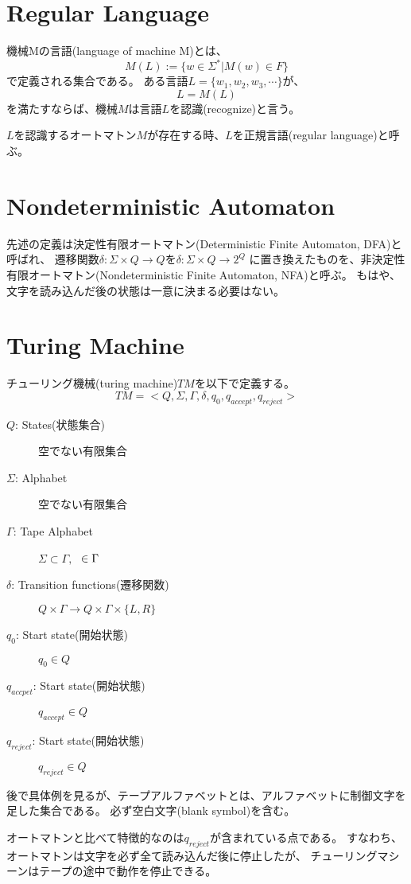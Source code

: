 \documentclass[b5paper,fleqn]{ltjsarticle}
\begin{document}
\section{Regular Language}
機械Mの言語(language of machine M)とは、
\[M(L):=\{w\in \Sigma^*|M(w)\in F\}\]
で定義される集合である。
ある言語$L=\{w_1,w_2,w_3,\cdots\}$が、
\[L=M(L)\]
を満たすならば、機械$M$は言語$L$を認識(recognize)と言う。\par
$L$を認識するオートマトン$M$が存在する時、$L$を正規言語(regular language)と呼ぶ。

\section{Nondeterministic Automaton}
先述の定義は決定性有限オートマトン(Deterministic Finite Automaton, DFA)と呼ばれ、
遷移関数$\delta:\Sigma\times Q\rightarrow Q$を$\delta:\Sigma\times Q\rightarrow 2^Q$
に置き換えたものを、非決定性有限オートマトン(Nondeterministic Finite Automaton, NFA)と呼ぶ。
もはや、文字を読み込んだ後の状態は一意に決まる必要はない。

\newpage
\section{Turing Machine}
チューリング機械(turing machine)$TM$を以下で定義する。
\[TM=<Q,\Sigma,\Gamma,\delta,q_0,q_{accept},q_{reject}>\]
\begin{description}
\item[$Q$: States(状態集合)] 空でない有限集合
\item[$\Sigma$: Alphabet] 空でない有限集合
\item[$\Gamma$: Tape Alphabet] $\Sigma\subset\Gamma,$ \textvisiblespace$\hskip3pt\in\Gamma$
\item[$\delta$: Transition functions(遷移関数)] $Q\times\Gamma\rightarrow Q\times\Gamma\times\{L,R\}$
\item[$q_0$: Start state(開始状態)] $q_0\in Q$
\item[$q_{accpet}$: Start state(開始状態)] $q_{accept}\in Q$
\item[$q_{reject}$: Start state(開始状態)] $q_{reject}\in Q$
\end{description}
後で具体例を見るが、テープアルファベットとは、アルファベットに制御文字を足した集合である。
必ず空白文字(blank symbol)\textvisiblespace を含む。\par
オートマトンと比べて特徴的なのは$q_{reject}$が含まれている点である。
すなわち、オートマトンは文字を必ず全て読み込んだ後に停止したが、
チューリングマシーンはテープの途中で動作を停止できる。
\end{document}
